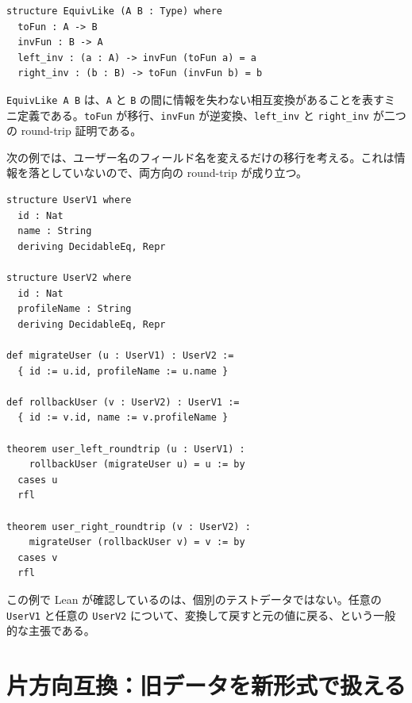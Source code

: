 \begin{listing}[htbp]
\begin{verbatim}
structure EquivLike (A B : Type) where
  toFun : A -> B
  invFun : B -> A
  left_inv : (a : A) -> invFun (toFun a) = a
  right_inv : (b : B) -> toFun (invFun b) = b
\end{verbatim}
\caption{完全同型を表す最小構造}
\label{lst:ch21-equivlike}
\end{listing}

\begin{leanbox}
\texttt{EquivLike A B} は、\texttt{A} と \texttt{B} の間に情報を失わない相互変換があることを表すミニ定義である。\texttt{toFun} が移行、\texttt{invFun} が逆変換、\texttt{left\_inv} と \texttt{right\_inv} が二つの round-trip 証明である。
\end{leanbox}

次の例では、ユーザー名のフィールド名を変えるだけの移行を考える。これは情報を落としていないので、両方向の round-trip が成り立つ。

\begin{listing}[htbp]
\begin{verbatim}
structure UserV1 where
  id : Nat
  name : String
  deriving DecidableEq, Repr

structure UserV2 where
  id : Nat
  profileName : String
  deriving DecidableEq, Repr

def migrateUser (u : UserV1) : UserV2 :=
  { id := u.id, profileName := u.name }

def rollbackUser (v : UserV2) : UserV1 :=
  { id := v.id, name := v.profileName }

theorem user_left_roundtrip (u : UserV1) :
    rollbackUser (migrateUser u) = u := by
  cases u
  rfl

theorem user_right_roundtrip (v : UserV2) :
    migrateUser (rollbackUser v) = v := by
  cases v
  rfl
\end{verbatim}
\caption{フィールド名変更は完全同型として証明できる}
\label{lst:ch21-user-roundtrip}
\end{listing}

この例で Lean が確認しているのは、個別のテストデータではない。任意の \texttt{UserV1} と任意の \texttt{UserV2} について、変換して戻すと元の値に戻る、という一般的な主張である。


\section{片方向互換：旧データを新形式で扱える}

